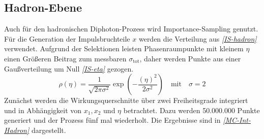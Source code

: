 \subsection{Hadron-Ebene}
Auch für den hadronischen Diphoton-Prozess wird Importance-Sampling genutzt. Für die Generation der Impulsbruchteile $x$ werden die Verteilung aus \textit{\autoref{IS-hadron}} verwendet. Aufgrund der Selektionen leisten Phasenraumpunkte mit kleinem $\eta$ einen Größeren Beitrag zum messbaren $\sigma_{\text{tot}}$, daher werden Punkte aus einer Gaußverteilung um Null \textit{\autoref{IS-eta}} gezogen.
\begin{equation}
\rho(\eta) = \frac{1}{\sqrt{2\pi \sigma^2}} \exp(-\frac{(\eta)^2}{2\sigma^2}) \quad \text{mit} \quad \sigma=2
\label{IS-eta}
\end{equation}
Zunächst werden die Wirkungsquerschnitte über zwei Freiheitsgrade integriert und in Abhängigkeit von $x_1, x_2$ und $\eta$ betrachtet. Dazu werden 50.000.000 Punkte generiert und der Prozess fünf mal wiederholt. Die Ergebnisse sind in \textit{\autoref{MC-Int-Hadron}} dargestellt.
